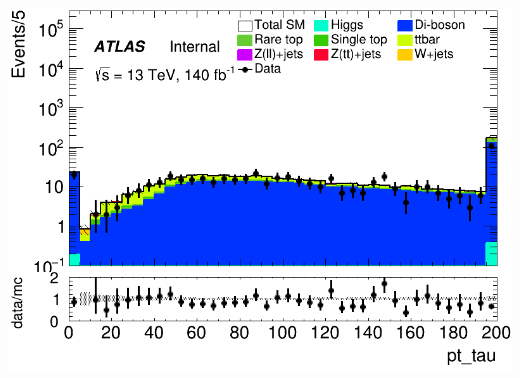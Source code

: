 \documentclass[usenames,dvipsnames]{beamer}
\begin{document}
\begin{frame}
\begin{minipage}{0.32\textwidth}
        \includegraphics[width=\textwidth]{graphics/LLL_met/LLL_met_pt_tau.png}
    \end{minipage}
    
    \vspace{0.5cm} %
\end{frame}
\end{document}
